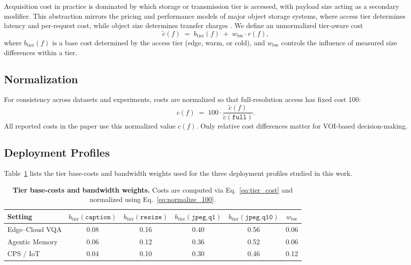Acquisition cost in practice is dominated by which storage or transmission tier
is accessed, with payload size acting as a secondary modifier. This abstraction
mirrors the pricing and performance models of major object storage systems,
where access tier determines latency and per-request cost, while object size
determines transfer charges
\cite{aws_s3_pricing, gcs_pricing, azure_blob_pricing}.
We define an unnormalized tier-aware cost
\begin{equation}
\tilde{c}(f)
\;=\;
b_{\mathrm{tier}}(f)
\;+\;
w_{\mathrm{bw}} \cdot r(f),
\label{eq:tier_cost}
\end{equation}
where $b_{\mathrm{tier}}(f)$ is a base cost determined by the access tier
(edge, warm, or cold), and $w_{\mathrm{bw}}$ controls the influence of
measured size differences within a tier.

\subsection{Normalization}
\label{sec:normalization}

For consistency across datasets and experiments, costs are normalized so that
full-resolution access has fixed cost 100:
\begin{equation}
c(f)
\;=\;
100 \cdot
\frac{\tilde{c}(f)}{\tilde{c}(\texttt{full})}.
\label{eq:normalize_100}
\end{equation}
All reported costs in the paper use this normalized value $c(f)$.
Only relative cost differences matter for VOI-based decision-making.

\subsection{Deployment Profiles}
\label{sec:deployment}

Table~\ref{tab:cost_weights} lists the tier base-costs and bandwidth weights used
for the three deployment profiles studied in this work.

\begin{table}[t]
\centering
\small
\caption{\textbf{Tier base-costs and bandwidth weights.}
Costs are computed via Eq.~\eqref{eq:tier_cost} and normalized using
Eq.~\eqref{eq:normalize_100}.}
\label{tab:cost_weights}
\begin{tabular}{lccccc}
\toprule
\textbf{Setting} &
$b_{\mathrm{tier}}(\texttt{caption})$ &
$b_{\mathrm{tier}}(\texttt{resize})$ &
$b_{\mathrm{tier}}(\texttt{jpeg\_q1})$ &
$b_{\mathrm{tier}}(\texttt{jpeg\_q10})$ &
$w_{\mathrm{bw}}$ \\
\midrule
Edge--Cloud VQA & 0.08 & 0.16 & 0.40 & 0.56 & 0.06 \\
Agentic Memory & 0.06 & 0.12 & 0.36 & 0.52 & 0.06 \\
CPS / IoT & 0.04 & 0.10 & 0.30 & 0.46 & 0.12 \\
\bottomrule
\end{tabular}
\end{table}

